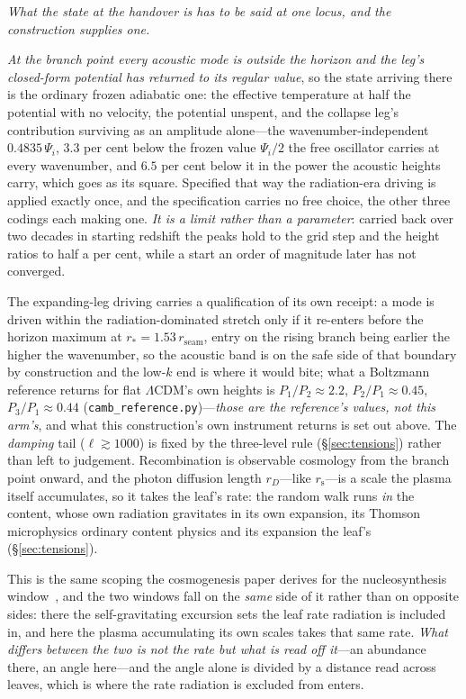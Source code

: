 \documentclass[11pt,a4paper]{article}
\theoremstyle{plain}
\theoremstyle{definition}
\theoremstyle{remark}
\newcommand{\rs}{r_{\mathrm{s}}}
\begin{document}
\emph{What the state at the handover is has to be said at one locus, and the construction supplies one.}

\emph{At the branch point every acoustic mode is outside the horizon and the leg's closed-form potential has
returned to its regular value}, so the state arriving there is the ordinary frozen adiabatic one: the
effective temperature at half the potential with no velocity, the potential unspent, and the collapse leg's
contribution surviving as an amplitude alone---the wavenumber-independent $0.4835\,\Psi_i$, $3.3$ per cent
below the frozen value $\Psi_i/2$ the free oscillator carries at every wavenumber, and $6.5$ per cent below it
in the power the acoustic heights carry, which goes as its square. Specified that way the
radiation-era driving is applied exactly once, and the specification carries no free choice, the other three
codings each making one. \emph{It is a limit rather than a parameter}: carried back over two decades in
starting redshift the peaks hold to the grid step and the height ratios to half a per cent, while a start an
order of magnitude later has not converged.

The expanding-leg driving carries a qualification of its own receipt: a mode is driven within the radiation-dominated stretch only if it re-enters before the horizon maximum at $r_{*}=1.53\,r_{\mathrm{seam}}$, entry on the rising branch being earlier the higher the wavenumber, so the acoustic band is on the safe side of that boundary by construction and the low-$k$ end is where it would bite; what a Boltzmann reference returns for flat $\Lambda$CDM's own heights is $P_1/P_2\approx2.2$, $P_2/P_1\approx0.45$, $P_3/P_1\approx0.44$ (\texttt{camb\_reference.py})---\emph{those are the reference's values, not this arm's}, and what this construction's own instrument returns is set out above. The \emph{damping} tail ($\ell\gtrsim1000$) is fixed by the three-level rule (\S\ref{sec:tensions}) rather than left to judgement. Recombination is observable cosmology from the branch point onward, and the photon diffusion length $r_D$---like $\rs$---is a scale the plasma itself accumulates, so it takes the leaf's rate: the random walk runs \emph{in} the content, whose own radiation gravitates in its own expansion, its Thomson microphysics ordinary content physics and its expansion the leaf's (\S\ref{sec:tensions}). 

This is the same scoping the cosmogenesis paper derives for the nucleosynthesis window~\cite{JanzenCosmogenesis}, and the two windows fall on the \emph{same} side of it rather than on opposite sides: there the self-gravitating excursion sets the leaf rate radiation is included in, and here the plasma accumulating its own scales takes that same rate. \emph{What differs between the two is not the rate but what is read off it}---an abundance there, an angle here---and the angle alone is divided by a distance read across leaves, which is where the rate radiation is excluded from enters. 
\end{document}
